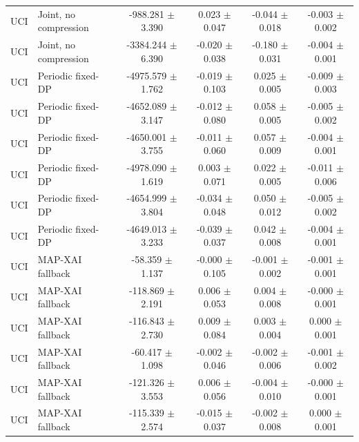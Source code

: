 \begin{tabular}{llcccc}
UCI & Joint, no compression & -988.281 $\pm$ 3.390 & 0.023 $\pm$ 0.047 & -0.044 $\pm$ 0.018 & -0.003 $\pm$ 0.002 \\
UCI & Joint, no compression & -3384.244 $\pm$ 6.390 & -0.020 $\pm$ 0.038 & -0.180 $\pm$ 0.031 & -0.004 $\pm$ 0.001 \\
UCI & Periodic fixed-DP & -4975.579 $\pm$ 1.762 & -0.019 $\pm$ 0.103 & 0.025 $\pm$ 0.005 & -0.009 $\pm$ 0.003 \\
UCI & Periodic fixed-DP & -4652.089 $\pm$ 3.147 & -0.012 $\pm$ 0.080 & 0.058 $\pm$ 0.005 & -0.005 $\pm$ 0.002 \\
UCI & Periodic fixed-DP & -4650.001 $\pm$ 3.755 & -0.011 $\pm$ 0.060 & 0.057 $\pm$ 0.009 & -0.004 $\pm$ 0.001 \\
UCI & Periodic fixed-DP & -4978.090 $\pm$ 1.619 & 0.003 $\pm$ 0.071 & 0.022 $\pm$ 0.005 & -0.011 $\pm$ 0.006 \\
UCI & Periodic fixed-DP & -4654.999 $\pm$ 3.804 & -0.034 $\pm$ 0.048 & 0.050 $\pm$ 0.012 & -0.005 $\pm$ 0.002 \\
UCI & Periodic fixed-DP & -4649.013 $\pm$ 3.233 & -0.039 $\pm$ 0.037 & 0.042 $\pm$ 0.008 & -0.004 $\pm$ 0.001 \\
UCI & MAP-XAI fallback & -58.359 $\pm$ 1.137 & -0.000 $\pm$ 0.105 & -0.001 $\pm$ 0.002 & -0.001 $\pm$ 0.001 \\
UCI & MAP-XAI fallback & -118.869 $\pm$ 2.191 & 0.006 $\pm$ 0.053 & 0.004 $\pm$ 0.008 & -0.000 $\pm$ 0.001 \\
UCI & MAP-XAI fallback & -116.843 $\pm$ 2.730 & 0.009 $\pm$ 0.084 & 0.003 $\pm$ 0.004 & 0.000 $\pm$ 0.001 \\
UCI & MAP-XAI fallback & -60.417 $\pm$ 1.098 & -0.002 $\pm$ 0.046 & -0.002 $\pm$ 0.006 & -0.001 $\pm$ 0.002 \\
UCI & MAP-XAI fallback & -121.326 $\pm$ 3.553 & 0.006 $\pm$ 0.056 & -0.004 $\pm$ 0.010 & -0.000 $\pm$ 0.001 \\
UCI & MAP-XAI fallback & -115.339 $\pm$ 2.574 & -0.015 $\pm$ 0.037 & -0.002 $\pm$ 0.008 & 0.000 $\pm$ 0.001 \\
\bottomrule
\end{tabular}
